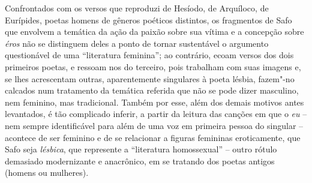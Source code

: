 Confrontados com os versos que reproduzi de Hesíodo, de Arquíloco, de Eurípides,
poetas homens de gêneros poéticos distintos, os fragmentos de Safo que envolvem
a temática da ação da paixão sobre sua vítima e a concepção sobre \textit{éros}
não se distinguem deles a ponto de tornar sustentável o argumento questionável
de uma “literatura feminina”; ao contrário, ecoam versos
dos dois primeiros poetas, e ressoam nos do terceiro, pois trabalham com
suas imagens e, se lhes acrescentam outras, aparentemente singulares à poeta
lésbia, fazem"-no calcados num tratamento da temática referida que não se pode
dizer masculino, nem feminino, mas tradicional. Também por esse, além dos demais motivos antes levantados, é tão complicado
inferir, a partir da leitura das canções em que o \textit{eu} -- nem sempre
identificável para além de uma voz em primeira pessoa do singular -- acontece de ser
feminino e de se relacionar a figuras femininas eroticamente, que Safo seja
\textit{lésbica}, que represente a “literatura homossexual” -- outro rótulo
demasiado modernizante e anacrônico, em se tratando dos poetas antigos
(homens ou mulheres).


